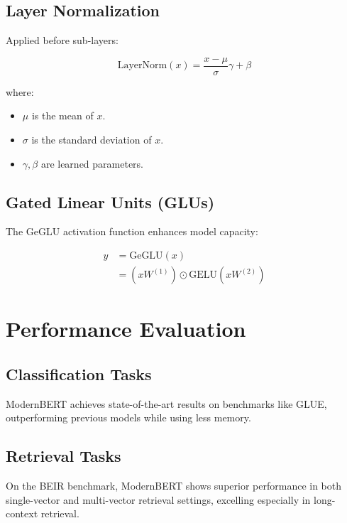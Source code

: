 \documentclass{article}
\begin{document}
\subsection{Layer Normalization}  
  
Applied before sub-layers:  
  
\[  
\text{LayerNorm}(x) = \frac{x - \mu}{\sigma} \gamma + \beta  
\]  
  
where:  
  
\begin{itemize}  
    \item \( \mu \) is the mean of \( x \).  
    \item \( \sigma \) is the standard deviation of \( x \).  
    \item \( \gamma, \beta \) are learned parameters.  
\end{itemize}  
  
\subsection{Gated Linear Units (GLUs)}  
  
The GeGLU activation function enhances model capacity:  
  
\[  
\begin{align*}  
y &= \text{GeGLU}(x) \\  
&= \left( x W^{(1)} \right) \odot \text{GELU}\left( x W^{(2)} \right)  
\end{align*}  
\]  
  
\section{Performance Evaluation}  
  
\subsection{Classification Tasks}  
  
ModernBERT achieves state-of-the-art results on benchmarks like GLUE, outperforming previous models while using less memory.  
  
\subsection{Retrieval Tasks}  
  
On the BEIR benchmark, ModernBERT shows superior performance in both single-vector and multi-vector retrieval settings, excelling especially in long-context retrieval.  
  
\end{document}
